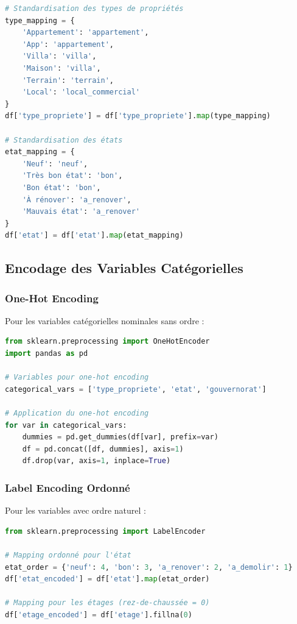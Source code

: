 \begin{lstlisting}[language=Python,caption=Normalisation Catégorielles]
# Standardisation des types de propriétés
type_mapping = {
    'Appartement': 'appartement',
    'App': 'appartement',
    'Villa': 'villa',
    'Maison': 'villa',
    'Terrain': 'terrain',
    'Local': 'local_commercial'
}
df['type_propriete'] = df['type_propriete'].map(type_mapping)

# Standardisation des états
etat_mapping = {
    'Neuf': 'neuf',
    'Très bon état': 'bon',
    'Bon état': 'bon',
    'À rénover': 'a_renover',
    'Mauvais état': 'a_renover'
}
df['etat'] = df['etat'].map(etat_mapping)
\end{lstlisting}

\subsection{Encodage des Variables Catégorielles}
\label{subsec:encodage_variables}

\subsubsection{One-Hot Encoding}

Pour les variables catégorielles nominales sans ordre :

\begin{lstlisting}[language=Python,caption=One-Hot Encoding]
from sklearn.preprocessing import OneHotEncoder
import pandas as pd

# Variables pour one-hot encoding
categorical_vars = ['type_propriete', 'etat', 'gouvernorat']

# Application du one-hot encoding
for var in categorical_vars:
    dummies = pd.get_dummies(df[var], prefix=var)
    df = pd.concat([df, dummies], axis=1)
    df.drop(var, axis=1, inplace=True)
\end{lstlisting}

\subsubsection{Label Encoding Ordonné}

Pour les variables avec ordre naturel :

\begin{lstlisting}[language=Python,caption=Label Encoding Ordonné]
from sklearn.preprocessing import LabelEncoder

# Mapping ordonné pour l'état
etat_order = {'neuf': 4, 'bon': 3, 'a_renover': 2, 'a_demolir': 1}
df['etat_encoded'] = df['etat'].map(etat_order)

# Mapping pour les étages (rez-de-chaussée = 0)
df['etage_encoded'] = df['etage'].fillna(0)
\end{lstlisting}

